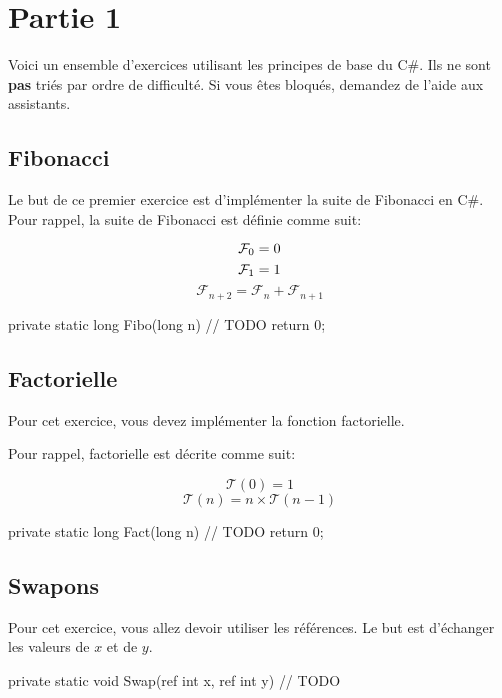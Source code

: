 \newpage
\section{Partie 1}

Voici un ensemble d'exercices utilisant les principes de base du C\#.
Ils ne sont \textbf{pas} triés par ordre de difficulté. Si vous êtes bloqués, demandez de
l'aide aux assistants.

\subsection{Fibonacci}

Le but de ce premier exercice est d'implémenter la suite de Fibonacci en C\#.
Pour rappel, la suite de Fibonacci est définie comme suit:

$$
\mathcal{F}_0 = 0\\
$$
$$
\mathcal{F}_1 = 1\\
$$
$$
\mathcal{F}_{n+2} = \mathcal{F}_{n} + \mathcal{F}_{n + 1}
$$

\begin{code}
private static long Fibo(long n)
{
	// TODO
    return 0;
}
\end{code}

\subsection{Factorielle}

Pour cet exercice, vous devez implémenter la fonction factorielle.

Pour rappel, factorielle est décrite comme suit:

$$
\mathcal{T}(0) = 1
$$
$$
\mathcal{T}(n) = n \times \mathcal{T}(n - 1)
$$

\begin{code}
private static long Fact(long n)
{
	// TODO
    return 0;
}
\end{code}

\subsection{Swapons}

Pour cet exercice, vous allez devoir utiliser les références.
Le but est d'échanger les valeurs de \(x\) et de \(y\).

\begin{code}
private static void Swap(ref int x, ref int y)
{
	// TODO
}
\end{code}

